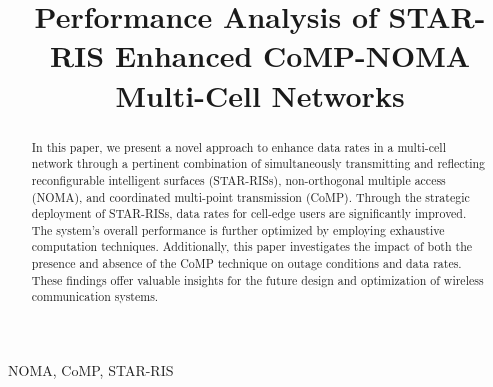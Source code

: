 \documentclass[conference]{IEEEtran}
\begin{document}
\title{Performance Analysis of STAR-RIS Enhanced CoMP-NOMA Multi-Cell Networks}

\author{
}
\maketitle

\begin{abstract}
In this paper, we present a novel approach to enhance data rates in a multi-cell network through a pertinent combination of simultaneously transmitting and reflecting reconfigurable intelligent surfaces (STAR-RISs), non-orthogonal multiple access (NOMA), and coordinated multi-point transmission (CoMP). Through the strategic deployment of STAR-RISs, data rates for cell-edge users are significantly improved. The system's overall performance is further optimized by employing exhaustive computation techniques. Additionally, this paper investigates the impact of both the presence and absence of the CoMP technique on outage conditions and data rates. These findings offer valuable insights for the future design and optimization of wireless communication systems.
\end{abstract}

\begin{IEEEkeywords}
	NOMA, CoMP, STAR-RIS
\end{IEEEkeywords}
\end{document}
